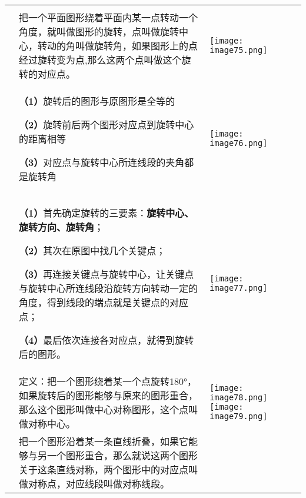 \begin{longtable}[]{@{}lll@{}}
\toprule
\endhead
& &\tabularnewline
&
把一个平面图形绕着平面内某一点转动一个角度，就叫做图形的旋转，点叫做旋转中心，转动的角叫做旋转角，如果图形上的点经过旋转变为点,那么这两个点叫做这个旋转的对应点。
&
\texttt{[image: image75.png]}\tabularnewline
\begin{minipage}[t]{0.30\columnwidth}\raggedright
\strut
\end{minipage} & \begin{minipage}[t]{0.30\columnwidth}\raggedright
\textbf{（1）}旋转后的图形与原图形是全等的

\textbf{（2）}旋转前后两个图形对应点到旋转中心的距离相等

\textbf{（3）}对应点与旋转中心所连线段的夹角都是旋转角\strut
\end{minipage} & \begin{minipage}[t]{0.30\columnwidth}\raggedright
\texttt{[image: image76.png]}\strut
\end{minipage}\tabularnewline
\begin{minipage}[t]{0.30\columnwidth}\raggedright
\strut
\end{minipage} & \begin{minipage}[t]{0.30\columnwidth}\raggedright
\textbf{（1）}首先确定旋转的三要素：\textbf{旋转中心、旋转方向、旋转角}；

\textbf{（2）}其次在原图中找几个关键点；

\textbf{（3）}再连接关键点与旋转中心，让关键点与旋转中心所连线段沿旋转方向转动一定的角度，得到线段的端点就是关键点的对应点；

\textbf{（4）}最后依次连接各对应点，就得到旋转后的图形。\strut
\end{minipage} & \begin{minipage}[t]{0.30\columnwidth}\raggedright
\texttt{[image: image77.png]}\strut
\end{minipage}\tabularnewline
&
定义：把一个图形绕着某一个点旋转180°，如果旋转后的图形能够与原来的图形重合，那么这个图形叫做中心对称图形，这个点叫做对称中心。
&
\texttt{[image: image78.png]}
\texttt{[image: image79.png]}\tabularnewline
\begin{minipage}[t]{0.30\columnwidth}\raggedright
\strut
\end{minipage} & \begin{minipage}[t]{0.30\columnwidth}\raggedright
把一个图形沿着某一条直线折叠，如果它能够与另一个图形重合，那么就说这两个图形关于这条直线对称，两个图形中的对应点叫做对称点，对应线段叫做对称线段。


\end{minipage}
\end{longtable}
